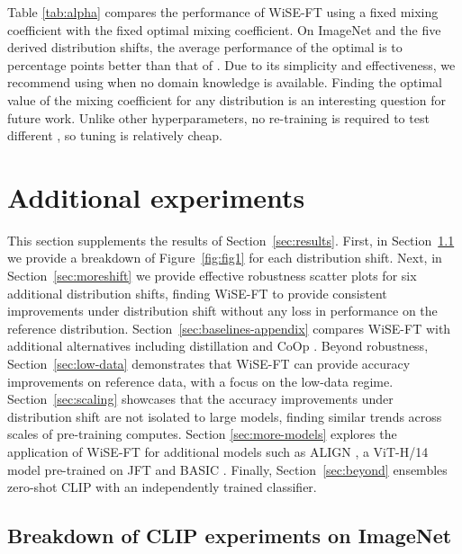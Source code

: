 Table \ref{tab:alpha} compares the performance of WiSE-FT using a fixed mixing coefficient  with the fixed optimal mixing coefficient. On ImageNet and the five derived distribution shifts, the average performance of the optimal  is  to  percentage points better than that of . 
Due to its simplicity and effectiveness, we recommend using  when no domain knowledge is available. Finding the optimal value of the mixing coefficient for any distribution is an interesting question for future work. Unlike other hyperparameters, no re-training is required to test different , so tuning is relatively cheap.


\section{Additional experiments}
\label{sec:appendix_additional_exps}




This section supplements the results of Section~\ref{sec:results}. First, in Section~\ref{sec:fig1breakdown} we provide a breakdown of Figure~\ref{fig:fig1} for each distribution shift.
Next, in Section~\ref{sec:moreshift} we provide effective robustness scatter plots for six additional distribution shifts, finding WiSE-FT to provide consistent improvements  under distribution shift without any loss in performance on the reference distribution.
Section~\ref{sec:baselines-appendix} compares WiSE-FT with additional alternatives including distillation and CoOp \cite{coop}.
Beyond robustness, Section~\ref{sec:low-data} demonstrates that WiSE-FT can provide accuracy improvements on reference data, with a focus on the low-data regime. Section~\ref{sec:scaling} showcases that the accuracy improvements under distribution shift are not isolated to large models, finding similar trends across scales of pre-training computes. Section \ref{sec:more-models} explores the application of WiSE-FT for additional models such as ALIGN \cite{jia2021scaling}, a ViT-H/14 model  pre-trained on JFT \cite{dosovitskiy2021an} and BASIC \cite{pham2021scaling}. Finally, Section~\ref{sec:beyond} ensembles zero-shot CLIP with an independently trained classifier.

\subsection{Breakdown of CLIP experiments on ImageNet}
\label{sec:fig1breakdown}

